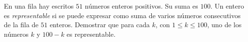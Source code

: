 En una fila hay escritos $51$ números enteros positivos. Su suma es $100$. Un entero es \emph{representable} si se puede expresar como suma de varios números consecutivos de la fila de $51$ enteros. Demostrar que para cada $k$, con
$1 \le k \le 100$, uno de los números $k$ y $100 - k$ es representable.
